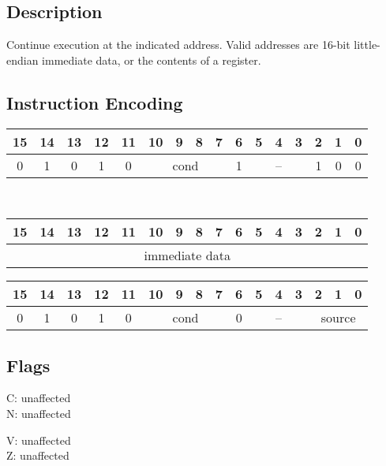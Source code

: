\documentclass[11pt]{book}
\newcommand*{\encoding}[1]{\noindent
\begin{tabular}{|c|c|c|c|c|c|c|c|c|c|c|c|c|c|c|c|}
\multicolumn{1}{c}{15}&
\multicolumn{1}{c}{14}&
\multicolumn{1}{c}{13}&
\multicolumn{1}{c}{12}&
\multicolumn{1}{c}{11}&
\multicolumn{1}{c}{10}&
\multicolumn{1}{c}{9}&
\multicolumn{1}{c}{8}&
\multicolumn{1}{c}{7}&
\multicolumn{1}{c}{6}&
\multicolumn{1}{c}{5}&
\multicolumn{1}{c}{4}&
\multicolumn{1}{c}{3}&
\multicolumn{1}{c}{2}&
\multicolumn{1}{c}{1}&
\multicolumn{1}{c}{0}\\\hline
#1\\\hline
\end{tabular}}
\begin{document}
\subsection*{Description}
Continue execution at the indicated address.
Valid addresses are 16-bit little-endian immediate data,
or the contents of a register.

\subsection*{Instruction Encoding}
\encoding{0&1&0&1&0%
&\multicolumn{4}{|c|}{cond}%
&1&\multicolumn{3}{|c|}{--}&1&0&0}\\\null\qquad
\encoding{\multicolumn{16}{|c|}{immediate data}}

\vspace{2\baselineskip}
\encoding{0&1&0&1&0%
&\multicolumn{4}{|c|}{cond}%
&0&\multicolumn{3}{|c|}{--}&\multicolumn{3}{|c|}{source}}

\subsection*{Flags}
\begin{multicols}{2}\noindent
  C: unaffected\\
  N: unaffected

  \columnbreak\noindent
  V: unaffected\\
  Z: unaffected
\end{multicols}
\end{document}

